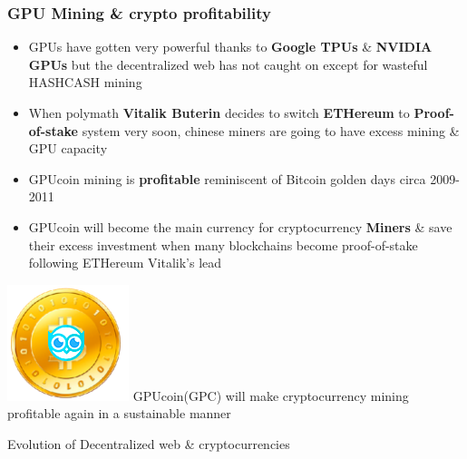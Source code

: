 \documentclass[10pt,handout]{beamer}
\begin{document}
\begin{frame}[t]\frametitle{GPU Mining \& crypto profitability}
\begin{itemize}[<+-| alert@+>]
\item GPUs have gotten very powerful thanks to \textbf{Google TPUs} \& \textbf{NVIDIA GPUs} but the decentralized web has not caught on except for wasteful HASHCASH mining
\item When polymath \textbf{Vitalik Buterin} decides to switch \textbf{ETHereum} to \textbf{Proof-of-stake} system very soon, chinese miners are going to have excess mining \& GPU capacity
\item GPUcoin mining is \textbf{profitable} reminiscent of Bitcoin golden days circa 2009-2011
\item GPUcoin will become the main currency for cryptocurrency \textbf{Miners} \& save their excess investment when many blockchains become proof-of-stake following ETHereum Vitalik's lead
\end{itemize}
 \pause
 \includegraphics[scale=0.1]{static/hootcoin} 
\Large{ GPUcoin(GPC) will make cryptocurrency mining profitable again in a sustainable manner}

\end{frame}

\begin{frame}[t]{Evolution of Decentralized web \& cryptocurrencies}
 
\end{frame} 
\end{document}
